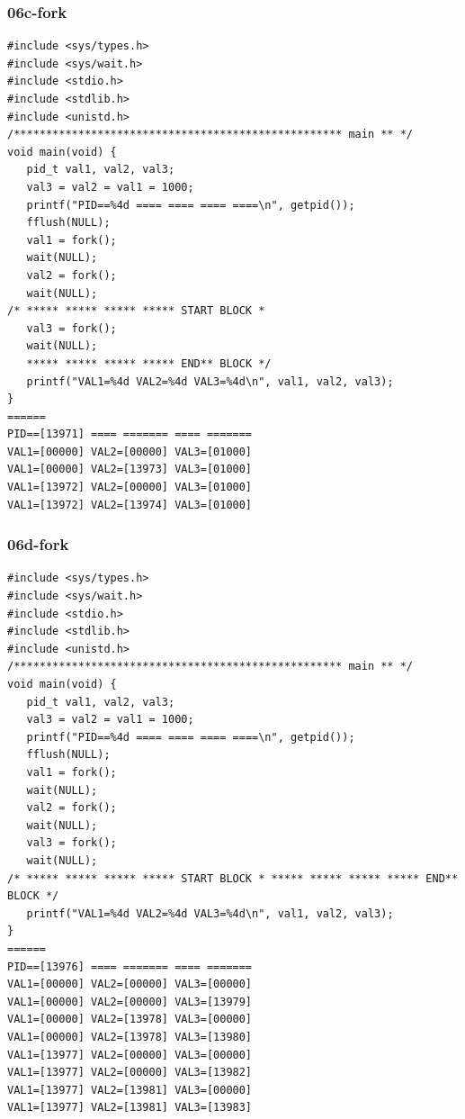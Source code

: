\documentclass[aspectratio=169, xcolor=table, notheorems, hyperref={pdfpagelabels=false}]{beamer}
\begin{document}
\begin{frame}[fragile]
\frametitle{06c-fork}
\begin{lstlisting}[basicstyle=\ttfamily\tiny]
#include <sys/types.h>
#include <sys/wait.h>
#include <stdio.h>
#include <stdlib.h>
#include <unistd.h>
/*************************************************** main ** */
void main(void) {
   pid_t val1, val2, val3;
   val3 = val2 = val1 = 1000;
   printf("PID==%4d ==== ==== ==== ====\n", getpid());
   fflush(NULL);
   val1 = fork();
   wait(NULL);
   val2 = fork();
   wait(NULL);
/* ***** ***** ***** ***** START BLOCK *
   val3 = fork();
   wait(NULL);
   ***** ***** ***** ***** END** BLOCK */
   printf("VAL1=%4d VAL2=%4d VAL3=%4d\n", val1, val2, val3);
}
======
PID==[13971] ==== ======= ==== =======
VAL1=[00000] VAL2=[00000] VAL3=[01000]
VAL1=[00000] VAL2=[13973] VAL3=[01000]
VAL1=[13972] VAL2=[00000] VAL3=[01000]
VAL1=[13972] VAL2=[13974] VAL3=[01000]

\end{lstlisting}
\end{frame}

\begin{frame}[fragile]
\frametitle{06d-fork}
\begin{lstlisting}[basicstyle=\ttfamily\tiny]
#include <sys/types.h>
#include <sys/wait.h>
#include <stdio.h>
#include <stdlib.h>
#include <unistd.h>
/*************************************************** main ** */
void main(void) {
   pid_t val1, val2, val3;
   val3 = val2 = val1 = 1000;
   printf("PID==%4d ==== ==== ==== ====\n", getpid());
   fflush(NULL);
   val1 = fork();
   wait(NULL);
   val2 = fork();
   wait(NULL);
   val3 = fork();
   wait(NULL);
/* ***** ***** ***** ***** START BLOCK * ***** ***** ***** ***** END** BLOCK */
   printf("VAL1=%4d VAL2=%4d VAL3=%4d\n", val1, val2, val3);
}
======
PID==[13976] ==== ======= ==== =======
VAL1=[00000] VAL2=[00000] VAL3=[00000]
VAL1=[00000] VAL2=[00000] VAL3=[13979]
VAL1=[00000] VAL2=[13978] VAL3=[00000]
VAL1=[00000] VAL2=[13978] VAL3=[13980]
VAL1=[13977] VAL2=[00000] VAL3=[00000]
VAL1=[13977] VAL2=[00000] VAL3=[13982]
VAL1=[13977] VAL2=[13981] VAL3=[00000]
VAL1=[13977] VAL2=[13981] VAL3=[13983]

\end{lstlisting}
\end{frame}
\end{document}
